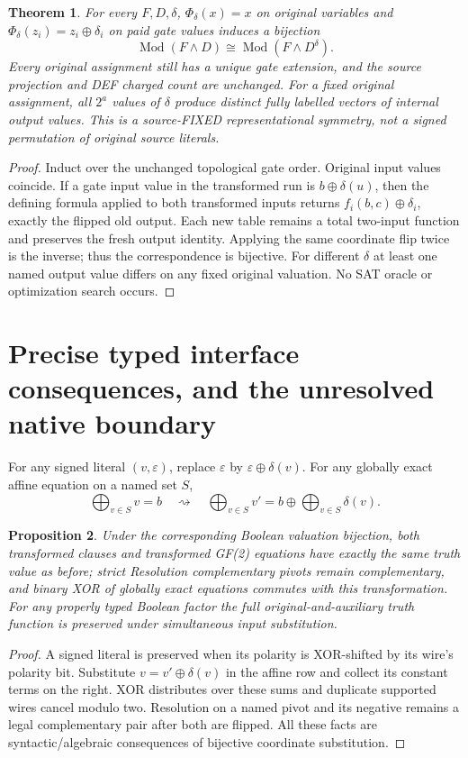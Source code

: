 \documentclass[11pt]{article}
\newtheorem{theorem}{Theorem}
\newtheorem{proposition}[theorem]{Proposition}
\begin{document}
\begin{theorem}
For every $F,D,\delta$, $\Phi_\delta(x)=x$ on original variables and $\Phi_\delta(z_i)=z_i\oplus\delta_i$ on paid gate values induces a bijection
\[
\operatorname{Mod}(F\wedge D)\cong\operatorname{Mod}(F\wedge D^\delta).
\]
Every original assignment still has a unique gate extension, and the source projection and DEF charged count are unchanged. For a fixed original assignment, all $2^a$ values of $\delta$ produce distinct fully labelled vectors of internal output values. This is a source-FIXED representational symmetry, not a signed permutation of original source literals.
\end{theorem}
\begin{proof}
Induct over the unchanged topological gate order. Original input values coincide. If a gate input value in the transformed run is $b\oplus\delta(u)$, then the defining formula applied to both transformed inputs returns $f_i(b,c)\oplus\delta_i$, exactly the flipped old output. Each new table remains a total two-input function and preserves the fresh output identity. Applying the same coordinate flip twice is the inverse; thus the correspondence is bijective. For different $\delta$ at least one named output value differs on any fixed original valuation. No SAT oracle or optimization search occurs.
\end{proof}

\section*{Precise typed interface consequences, and the unresolved native boundary}
For any signed literal $(v,\varepsilon)$, replace $\varepsilon$ by $\varepsilon\oplus\delta(v)$. For any globally exact affine equation on a named set $S$,
\[
\bigoplus_{v\in S}v=b
\quad\rightsquigarrow\quad
\boxed{\bigoplus_{v\in S}v'=b\oplus\bigoplus_{v\in S}\delta(v)}.
\]
\begin{proposition}
Under the corresponding Boolean valuation bijection, both transformed clauses and transformed GF(2) equations have exactly the same truth value as before; strict Resolution complementary pivots remain complementary, and binary XOR of globally exact equations commutes with this transformation. For any properly typed Boolean factor the full original-and-auxiliary truth function is preserved under simultaneous input substitution.
\end{proposition}
\begin{proof}
A signed literal is preserved when its polarity is XOR-shifted by its wire's polarity bit. Substitute $v=v'\oplus\delta(v)$ in the affine row and collect its constant terms on the right. XOR distributes over these sums and duplicate supported wires cancel modulo two. Resolution on a named pivot and its negative remains a legal complementary pair after both are flipped. All these facts are syntactic/algebraic consequences of bijective coordinate substitution.
\end{proof}
\end{document}
